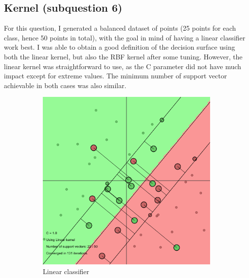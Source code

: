 \documentclass[11pt, a4paper]{article}
\begin{document}
\subsection{Kernel (subquestion 6)}

For this question, I generated a balanced dataset of points (25 points
for each class, hence 50 points in total), with the goal in mind of
having a linear classifier work best. I was able to obtain a good
definition of the decision surface using both the linear kernel, but
also the RBF kernel after some tuning. However, the linear kernel was
straightforward to use, as the C parameter did not have much impact
except for extreme values. The minimum number of support vector
achievable in both cases was also similar. 

\begin{figure}[H]
    \centering
    \begin{subfigure}{.5\textwidth}
      \centering
      \includegraphics[width=0.9\linewidth]{1-2-1-kernel6n2.png}
      \caption{Linear classifier}
      \label{fig:rbf_linclass}
    \end{subfigure}%
    \begin{subfigure}{.5\textwidth}
      \centering

\end{subfigure}
\end{figure}
\end{document}
